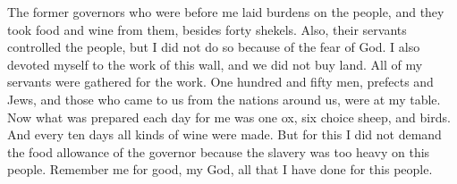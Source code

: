 \begin{biblechapter}
\verse The former governors who were before me laid burdens on the people, and they took food and wine from them, besides forty shekels. Also, their servants controlled the people, but I did not do so because of the fear of God.
\verse I also devoted myself to the work of this wall, and we did not buy land. All of my servants were gathered for the work.
\verse One hundred and fifty men, prefects and Jews, and those who came to us from the nations around us, were at my table.
\verse Now what was prepared each day for me was one ox, six choice sheep, and birds. And every ten days all kinds of wine were made. But for this I did not demand the food allowance of the governor because the slavery was too heavy on this people.
\verse Remember me for good, my God, all that I have done for this people.
\end{biblechapter}

